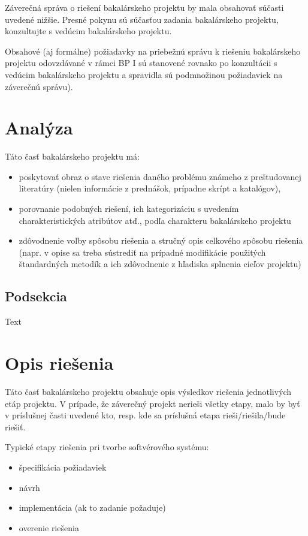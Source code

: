 \documentclass[12pt, a4paper, twoside, openright, slovak]{book}
\newcommand{\emptypage}{\newpage\thispagestyle{empty}\mbox{}\newpage}
\begin{document}
Záverečná správa o riešení bakalárskeho projektu by mala obsahovať súčasti uvedené nižšie. Presné pokynu sú súčasťou zadania bakalárskeho projektu, konzultujte s vedúcim bakalárskeho projektu.

Obsahové (aj formálne) požiadavky na priebežnú správu k riešeniu bakalárskeho projektu odovzdávané v rámci BP I sú stanovené rovnako po konzultácii s vedúcim bakalárskeho projektu a spravidla sú podmnožinou požiadaviek na záverečnú správu).

\emptypage
\chapter{Analýza}
Táto časť bakalárskeho projektu má:

\begin{itemize}
\item poskytovať obraz o stave riešenia daného problému známeho z preštudovanej literatúry (nielen informácie z prednášok, prípadne skrípt a katalógov),
\item  porovnanie podobných riešení, ich kategorizáciu s uvedením charakteristických atribútov atď., podľa charakteru bakalárskeho projektu
\item  zdôvodnenie voľby spôsobu riešenia a stručný opis celkového spôsobu riešenia (napr. v opise sa treba sústrediť na prípadné modifikácie použitých štandardných metodík a ich zdôvodnenie z hľadiska splnenia cieľov projektu)
\end{itemize}

\section{Podsekcia}
Text
\emptypage


\chapter{Opis riešenia}
Táto časť bakalárskeho projektu obsahuje opis výsledkov riešenia jednotlivých etáp projektu. V prípade, že záverečný projekt nerieši všetky etapy, malo by byť v príslušnej časti uvedené kto, resp. kde sa príslušná etapa rieši/riešila/bude riešiť.

Typické etapy riešenia pri tvorbe softvérového systému:
\begin{itemize}
    \item špecifikácia požiadaviek
    \item návrh
    \item implementácia (ak to zadanie požaduje)
    \item overenie riešenia
\end{itemize}
\end{document}
